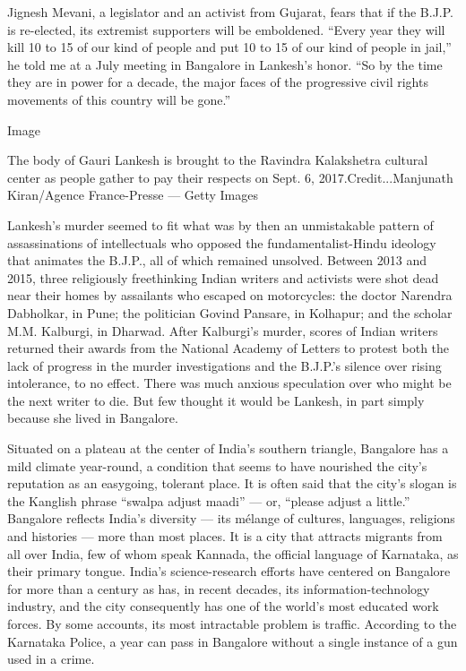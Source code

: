Jignesh Mevani, a legislator and an activist from Gujarat, fears that if
the B.J.P. is re-elected, its extremist supporters will be emboldened.
``Every year they will kill 10 to 15 of our kind of people and put 10 to
15 of our kind of people in jail,'' he told me at a July meeting in
Bangalore in Lankesh's honor. ``So by the time they are in power for a
decade, the major faces of the progressive civil rights movements of
this country will be gone.''

Image

The body of Gauri Lankesh is brought to the Ravindra Kalakshetra
cultural center as people gather to pay their respects on Sept. 6,
2017.Credit...Manjunath Kiran/Agence France-Presse --- Getty Images

Lankesh's murder seemed to fit what was by then an unmistakable pattern
of assassinations of intellectuals who opposed the fundamentalist-Hindu
ideology that animates the B.J.P., all of which remained unsolved.
Between 2013 and 2015, three religiously freethinking Indian writers and
activists were shot dead near their homes by assailants who escaped on
motorcycles: the doctor Narendra Dabholkar, in Pune; the politician
Govind Pansare, in Kolhapur; and the scholar M.M. Kalburgi, in Dharwad.
After Kalburgi's murder, scores of Indian writers returned their awards
from the National Academy of Letters to protest both the lack of
progress in the murder investigations and the B.J.P.'s silence over
rising intolerance, to no effect. There was much anxious speculation
over who might be the next writer to die. But few thought it would be
Lankesh, in part simply because she lived in Bangalore.

Situated on a plateau at the center of India's southern triangle,
Bangalore has a mild climate year-round, a condition that seems to have
nourished the city's reputation as an easygoing, tolerant place. It is
often said that the city's slogan is the Kanglish phrase ``swalpa adjust
maadi'' --- or, ``please adjust a little.'' Bangalore reflects India's
diversity --- its mélange of cultures, languages, religions and
histories --- more than most places. It is a city that attracts migrants
from all over India, few of whom speak Kannada, the official language of
Karnataka, as their primary tongue. India's science-research efforts
have centered on Bangalore for more than a century as has, in recent
decades, its information-technology industry, and the city consequently
has one of the world's most educated work forces. By some accounts, its
most intractable problem is traffic. According to the Karnataka Police,
a year can pass in Bangalore without a single instance of a gun used in
a crime.

